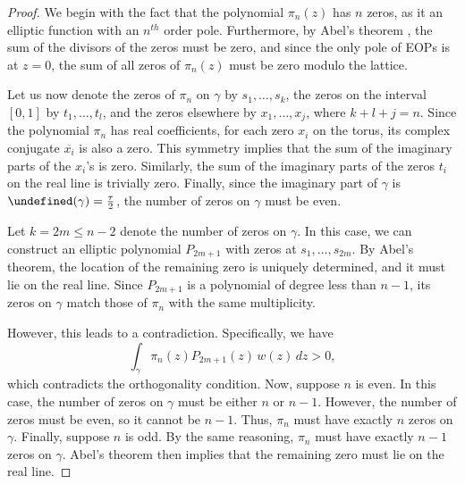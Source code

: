 \documentclass[11pt,a4paper]{article}
\theoremstyle{definition}
\let\Im\undefined
\DeclareMathOperator{\Im}{Im}
\numberwithin{equation}{section}
\numberwithin{theorem}{section}
\newcommand{\myrmk}[2]{\begin{quote}\fbox{\begin{minipage}{\linewidth}\small \noindent{\color{red}\bf #2:} #1{\color{red}}\end{minipage}}\end{quote}}
\newcommand{\rmkH}[1]{\myrmk{#1}{HD}}
\begin{document}
\begin{proof}
   We begin with the fact that the polynomial $\pi_n(z)$ has $n$ zeros, as it an elliptic function with an $n^{th}$ order pole. Furthermore, by Abel's theorem \cite{miranda}, the sum of the divisors of the zeros must be zero, and since the only pole of EOPs is at $z=0$, the sum of all zeros of $\pi_n(z)$ must be zero modulo the lattice. 
   
   Let us now denote the zeros of \( \pi_n \) on \( \gamma \) by \( s_1, \dots, s_k \), the zeros on the interval $[0,1]$ by \( t_1, \dots, t_l \), and the zeros elsewhere by \( x_1, \dots, x_j \), where $k+l+j =n$.  Since the polynomial \( \pi_n \) has real coefficients, for each zero \( x_i \) on the torus, its complex conjugate \( \overline{x_i} \) is also a zero. This symmetry implies that the sum of the imaginary parts of the \( x_i \)'s is zero. Similarly, the sum of the imaginary parts of the zeros \( t_i \) on the real line is trivially zero. Finally, since the imaginary part of \( \gamma \) is \( \Im(\gamma) = \frac{\tau}{2} \), the number of zeros on \( \gamma \) must be even.

    Let \( k=2m \leq n-2 \) denote the number of zeros on \( \gamma \). In this case, we can construct an elliptic polynomial \( P_{2m+1} \) with zeros at \( s_1, \dots, s_{2m} \). By Abel’s theorem, the location of the remaining zero is uniquely determined, and it must lie on the real line. Since \( P_{2m+1} \) is a polynomial of degree less than \( n-1 \), its zeros on $\gamma$ match those of \( \pi_n \) with the same multiplicity.

    However, this leads to a contradiction. Specifically, we have
    \[
    \int_{\gamma} \pi_n(z) P_{2m+1}(z) \, w(z)\, dz > 0,
    \]
    which contradicts the orthogonality condition.
    Now, suppose \( n \) is even. In this case, the number of zeros on \( \gamma \) must be either \( n \) or \( n-1 \). However, the number of zeros must be even, so it cannot be \( n-1 \). Thus, \( \pi_n \) must have exactly \( n \) zeros on \( \gamma \). Finally, suppose \( n \) is odd. By the same reasoning, \( \pi_n \) must have exactly \( n-1 \) zeros on \( \gamma \). Abel's theorem then implies that the remaining zero must lie on the real line.
\end{proof}
\end{document}
